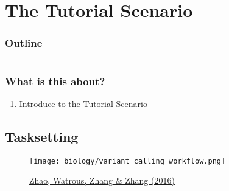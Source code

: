 \section{The Tutorial Scenario}

\begin{frame}
    \frametitle{Outline}
    \begin{columns}[t]
        \begin{column}{.5\textwidth}
            \tableofcontents[sections={1-7},currentsection]
        \end{column}
        \begin{column}{.5\textwidth}
            \tableofcontents[sections={8-15},currentsection]
        \end{column}
    \end{columns}
\end{frame}

\begin{frame}
	\frametitle{What is this about?}
	\begin{docs}[Objective]
		\begin{enumerate}
			\item Introduce to the Tutorial Scenario 
		\end{enumerate}
	\end{docs}
\end{frame}

\subsection{Tasksetting}

\begin{frame}
  \begin{figure}
    \centering
    \texttt{[image: biology/variant\_calling\_workflow.png]}

    \smallskip

    \caption{\href{https://www.intechopen.com/chapters/53334}{Zhao, Watrous, Zhang \& Zhang (2016)}}
  \end{figure}
\end{frame}



